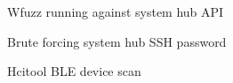 \documentclass{article}
\begin{document}
\begin{figure}[!htb]
	\caption{Wfuzz running against system hub API}
\end{figure}

\begin{figure}[!htb]
\caption{Brute forcing system hub SSH password}
\end{figure}

\begin{figure}[!htb]
\caption{Hcitool BLE device scan}
\end{figure}
\end{document}
